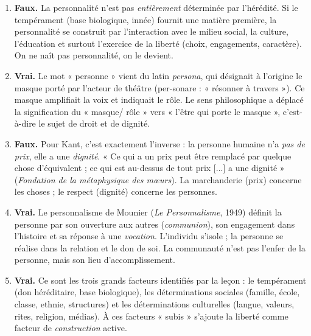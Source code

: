 \documentclass[11pt]{article}
\newcommand{\cle}[1]{{\popxbold\color{popdark}#1}}
\begin{document}
\begin{corrige}
\begin{enumerate}
\item \textbf{Faux.} La personnalité n'est pas \emph{entièrement} déterminée par l'hérédité. Si le \cle{tempérament} (base biologique, innée) fournit une matière première, la personnalité se construit par l'interaction avec le \cle{milieu social}, la \cle{culture}, l'\cle{éducation} et surtout l'exercice de la \cle{liberté} (choix, engagements, caractère). On ne naît pas personnalité, on le devient.
\item \textbf{Vrai.} Le mot « personne » vient du latin \emph{persona}, qui désignait à l'origine le masque porté par l'acteur de théâtre (per-sonare : « résonner à travers »). Ce masque amplifiait la voix et indiquait le rôle. Le sens philosophique a déplacé la signification du « masque/ rôle » vers « l'être qui porte le masque », c'est-à-dire le sujet de droit et de dignité.
\item \textbf{Faux.} Pour Kant, c'est exactement l'inverse : la personne humaine n'a \emph{pas de prix}, elle a une \emph{dignité}. « Ce qui a un prix peut être remplacé par quelque chose d'équivalent ; ce qui est au-dessus de tout prix [...] a une dignité » (\emph{Fondation de la métaphysique des mœurs}). La marchanderie (prix) concerne les choses ; le respect (dignité) concerne les personnes.
\item \textbf{Vrai.} Le personnalisme de Mounier (\emph{Le Personnalisme}, 1949) définit la personne par son ouverture aux autres (\emph{communion}), son engagement dans l'histoire et sa réponse à une \emph{vocation}. L'individu s'isole ; la personne se réalise dans la relation et le don de soi. La communauté n'est pas l'enfer de la personne, mais son lieu d'accomplissement.
\item \textbf{Vrai.} Ce sont les trois grands facteurs identifiés par la leçon : le \cle{tempérament} (don héréditaire, base biologique), les \cle{déterminations sociales} (famille, école, classe, ethnie, structures) et les \cle{déterminations culturelles} (langue, valeurs, rites, religion, médias). À ces facteurs « subis » s'ajoute la liberté comme facteur de \emph{construction} active.
\end{enumerate}
\end{corrige}
\end{document}
